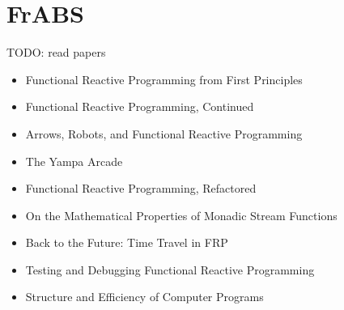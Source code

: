 \chapter{FrABS}

TODO: read papers
\begin{itemize}
	\item Functional Reactive Programming from First Principles
	\item Functional Reactive Programming, Continued
	\item Arrows, Robots, and Functional Reactive Programming
	\item The Yampa Arcade
	\item Functional Reactive Programming, Refactored
	\item On the Mathematical Properties of Monadic Stream Functions
	\item Back to the Future: Time Travel in FRP
	\item Testing and Debugging Functional Reactive Programming
	\item Structure and Efficiency of Computer Programs
\end{itemize}